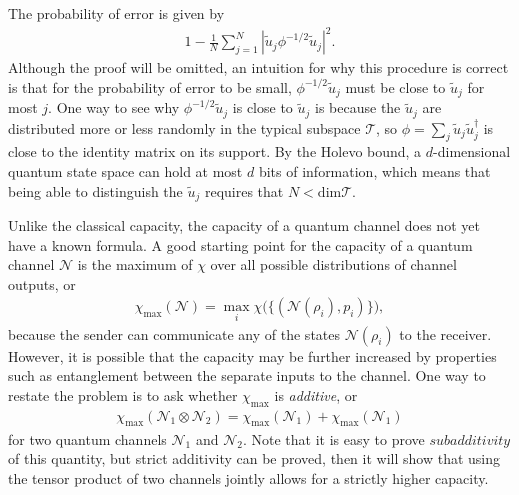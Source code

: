 \documentclass[a4paper, 12pt]{article}
\numberwithin{equation}{section}
\numberwithin{figure}{section}
\theoremstyle{definition}
\begin{document}
    The probability of error is given by
    \begin{align}
        1 - \frac{1}{N} \sum_{j = 1}^N |\tilde{u}_j \phi^{-1/2} \tilde{u}_j|^2.
    \end{align}
    Although the proof will be omitted, an intuition for why this procedure is correct is that for the probability of error to be small, $\phi^{-1/2} \tilde{u}_j$ must be close to $\tilde{u}_j$ for most $j$. One way to see why $\phi^{-1/2} \tilde{u}_j$ is close to $\tilde{u}_j$ is because the $\tilde{u}_j$ are distributed more or less randomly in the typical subspace $\mathcal{T}$, so $\phi = \sum_j \tilde{u}_j \tilde{u}_j^\dagger$ is close to the identity matrix on its support. By the Holevo bound, a $d$-dimensional quantum state space can hold at most $d$ bits of information, which means that being able to distinguish the $\tilde{u}_j$ requires that $N < \text{dim} \mathcal{T}$. \par
    Unlike the classical capacity, the capacity of a quantum channel does not yet have a known formula. A good starting point for the capacity of a quantum channel $\mathcal{N}$ is the maximum of $\chi$ over all possible distributions of channel outputs, or
    \begin{align}
        \chi_{\text{max}}(\mathcal{N}) = \max_i \chi \bigl( \{(\mathcal{N}(\rho_i), p_i)\} \bigr),
    \end{align}
    because the sender can communicate any of the states $\mathcal{N}(\rho_i)$ to the receiver. However, it is possible that the capacity may be further increased by properties such as entanglement between the separate inputs to the channel. One way to restate the problem is to ask whether $\chi_\text{max}$ is \textit{additive}, or
    \begin{align}
        \chi_\text{max}(\mathcal{N}_1 \otimes \mathcal{N}_2) = \chi_\text{max}(\mathcal{N}_1) + \chi_\text{max}(\mathcal{N}_1)
    \end{align}
    for two quantum channels $\mathcal{N}_1$ and $\mathcal{N}_2$. Note that it is easy to prove $\textit{subadditivity}$ of this quantity, but strict additivity can be proved, then it will show that using the tensor product of two channels jointly allows for a strictly higher capacity.
\end{document}
